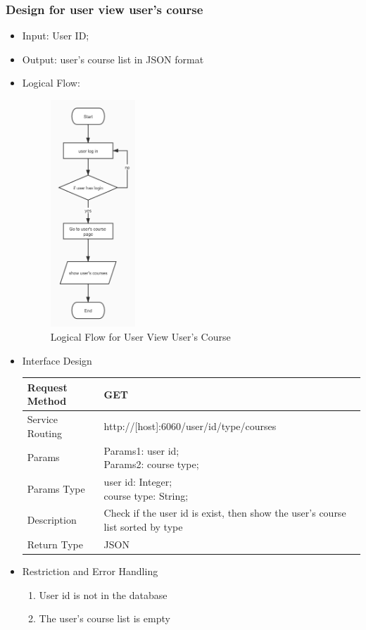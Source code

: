 \documentclass[16pt]{scrreprt}
\begin{document}
\subsubsection{Design for user view user's course}
\begin{itemize}
    \item Input: User ID; 
    \item Output: user's course list in JSON format
    \item Logical Flow:
     \begin{figure}[H]
    \centering
    \includegraphics[width=0.3\textwidth]{diagrams/mycourse.jpg}
    \caption{Logical Flow for User View User's Course}
\end{figure}
    \item Interface Design
    \begin{center}
    \begin{tabular}{p{5cm}p{10cm}}
        \hline
        Request Method & GET\\
        \hline
        Service Routing &  http://[host]:6060/user/{id}/{type}/courses\\
        \hline
        Params & \makecell[l]{Params1: user id;\\ Params2: course type;}\\ 
        \hline
        Params Type & \makecell[l]{user id: Integer;\\course type: String;}\\
        \hline
        Description & Check if the user id is exist, then show the user's course list sorted by type\\
        \hline
        Return Type & JSON\\
        \hline
    \end{tabular}
\end{center}
\item Restriction and Error Handling\\
\begin{enumerate}
    \item User id is not in the database
    \item The user's course list is empty
\end{enumerate} 
\end{itemize}
\end{document}

